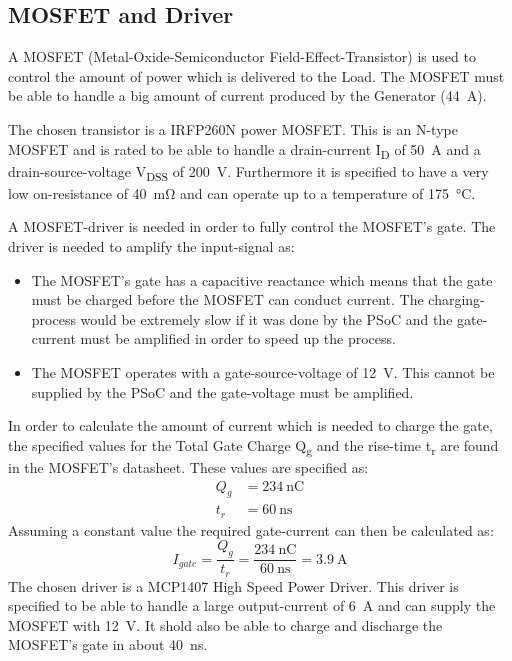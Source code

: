 \subsection{MOSFET and Driver}
A MOSFET (Metal-Oxide-Semiconductor Field-Effect-Transistor) is used to control the amount of power which is delivered to the Load. The MOSFET must be able to handle a big amount of current produced by the Generator (\SI{44}{\ampere}).

The chosen transistor is a IRFP260N power MOSFET. This is an N-type MOSFET and is rated to be able to handle a drain-current I\textsubscript{D} of \SI{50}{\ampere} and a drain-source-voltage V\textsubscript{DSS} of \SI{200}{\volt}. Furthermore it is specified to have a very low on-resistance of \SI{40}{\milli \ohm} and can operate up to a temperature of \SI{175}{\celsius}.

A MOSFET-driver is needed in order to fully control the MOSFET's gate. The driver is needed to amplify the input-signal as:
\begin{itemize}
	\item The MOSFET's gate has a capacitive reactance which means that the gate must be charged before the MOSFET can conduct current. The charging-process would be extremely slow if it was done by the PSoC and the gate-current must be amplified in order to speed up the process.
	\item The MOSFET operates with a gate-source-voltage of \SI{12}{\volt}. This cannot be supplied by the PSoC and the gate-voltage must be amplified. 
\end{itemize}

In order to calculate the amount of current which is needed to charge the gate, the specified values for the Total Gate Charge Q\textsubscript{g} and the rise-time t\textsubscript{r} are found in the MOSFET's datasheet. These values are specified as:
\begin{equation}
\begin{split}
	Q_g &= \SI{234}{\nano \coulomb}\\
	t_r &= \SI{60}{\nano \second}
\end{split}
\end{equation}
Assuming a constant value the required gate-current can then be calculated as:
\begin{equation}
	I_{gate} = \frac{Q_g}{t_r} = \frac{\SI{234}{\nano \coulomb}}{\SI{60}{\nano \second}} = \SI{3.9}{\ampere}
\end{equation}
The chosen driver is a MCP1407 High Speed Power Driver. This driver is specified to be able to handle a large output-current of \SI{6}{\ampere} and can supply the MOSFET with \SI{12}{\volt}. It shold also be able to charge and discharge the MOSFET's gate in about \SI{40}{\nano \second}.

